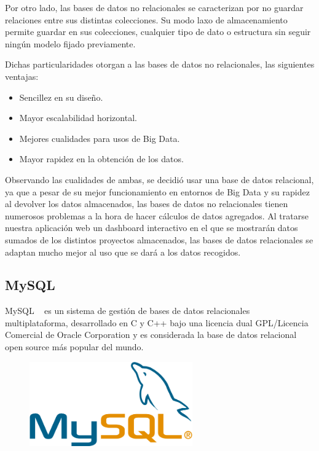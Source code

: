 \documentclass[a4paper, spanish, 12pt]{book}
\begin{document}
Por otro lado, las bases de datos no relacionales se caracterizan por no guardar
relaciones entre sus distintas colecciones. Su modo laxo de almacenamiento permite
guardar en sus colecciones, cualquier tipo de dato o estructura sin seguir
ning\'un modelo fijado previamente.

Dichas particularidades otorgan a las bases de datos no relacionales, las siguientes
ventajas:

\begin{itemize}

\item Sencillez en su dise\~no.

\item Mayor escalabilidad horizontal.

\item Mejores cualidades para usos de Big Data.

\item Mayor rapidez en la obtenci\'on de los datos.

\end{itemize}

Observando las cualidades de ambas, se decidi\'o usar una base de datos relacional,
ya que a pesar de su mejor funcionamiento en entornos de Big Data y su rapidez al
devolver los datos almacenados, las bases de datos no relacionales tienen numerosos
problemas a la hora de hacer c\'alculos de datos agregados. Al tratarse nuestra
aplicaci\'on web un dashboard interactivo en el que se mostrar\'an datos sumados de
los distintos proyectos almacenados, las bases de datos relacionales se adaptan mucho
mejor al uso que se dar\'a a los datos recogidos.

\subsection{MySQL}
\label{subsec:mysql}

MySQL ~\cite{mysql} es un sistema de gesti\'on de bases de datos relacionales multiplataforma,
desarrollado en C y C++ bajo una licencia dual GPL/Licencia Comercial de Oracle
Corporation y es considerada la base de datos relacional open source m\'as popular del mundo.

\begin{figure}[H]
  \centering
  \includegraphics[width=7cm, keepaspectratio]{img/mysql-logo}
\end{figure}
\end{document}
